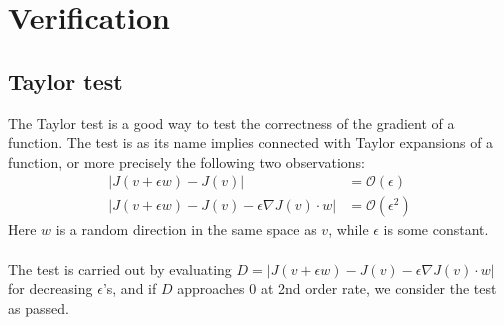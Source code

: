 \chapter{Verification}\label{Verification chapter}
\section{Taylor test} \label{Taylor_sec}
The Taylor test is a good way to test the correctness of the gradient of a function. The test is as its name implies connected with Taylor expansions of a function, or more precisely the following two observations:
\begin{align*}
|J(v+\epsilon w)-J(v)| &= \mathcal{O}(\epsilon) \\
|J(v+\epsilon w)-J(v)-\epsilon\nabla J(v)\cdot w| &= \mathcal{O}(\epsilon^2)
\end{align*}
Here $w$ is a random direction in the same space as $v$, while $\epsilon$ is some constant. 
\\
\\
The test is carried out by evaluating $D=|J(v+\epsilon w)-J(v)-\epsilon\nabla J(v)\cdot w|$ for decreasing $\epsilon$'s, and if $D$ approaches 0 at 2nd order rate, we consider the test as passed.

